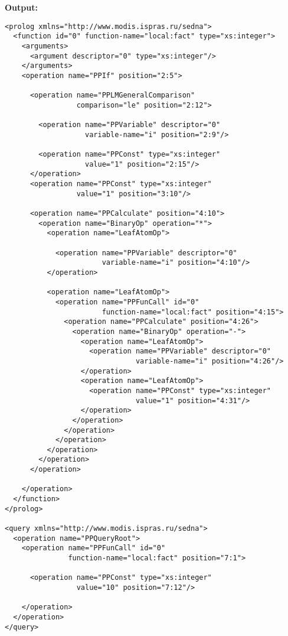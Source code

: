 \documentclass[a4paper,12pt]{article}
\begin{document}
\medskip
\noindent
\textbf{Output:}

\small{
\begin{verbatim}
<prolog xmlns="http://www.modis.ispras.ru/sedna">
  <function id="0" function-name="local:fact" type="xs:integer">
    <arguments>
      <argument descriptor="0" type="xs:integer"/>
    </arguments>
    <operation name="PPIf" position="2:5">

      <operation name="PPLMGeneralComparison"
                 comparison="le" position="2:12">

        <operation name="PPVariable" descriptor="0"
                   variable-name="i" position="2:9"/>

        <operation name="PPConst" type="xs:integer"
                   value="1" position="2:15"/>
      </operation>
      <operation name="PPConst" type="xs:integer"
                 value="1" position="3:10"/>

      <operation name="PPCalculate" position="4:10">
        <operation name="BinaryOp" operation="*">
          <operation name="LeafAtomOp">

            <operation name="PPVariable" descriptor="0"
                       variable-name="i" position="4:10"/>
          </operation>

          <operation name="LeafAtomOp">
            <operation name="PPFunCall" id="0"
                       function-name="local:fact" position="4:15">
              <operation name="PPCalculate" position="4:26">
                <operation name="BinaryOp" operation="-">
                  <operation name="LeafAtomOp">
                    <operation name="PPVariable" descriptor="0"
                               variable-name="i" position="4:26"/>
                  </operation>
                  <operation name="LeafAtomOp">
                    <operation name="PPConst" type="xs:integer"
                               value="1" position="4:31"/>
                  </operation>
                </operation>
              </operation>
            </operation>
          </operation>
        </operation>
      </operation>

    </operation>
  </function>
</prolog>

<query xmlns="http://www.modis.ispras.ru/sedna">
  <operation name="PPQueryRoot">
    <operation name="PPFunCall" id="0"
               function-name="local:fact" position="7:1">

      <operation name="PPConst" type="xs:integer"
                 value="10" position="7:12"/>

    </operation>
  </operation>
</query>
\end{verbatim}}
\end{document}
